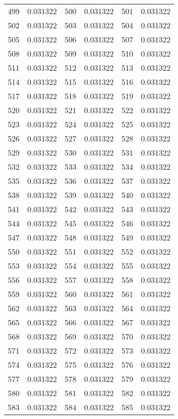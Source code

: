 \documentclass[12pt]{article}
\begin{document}
\begin{longtable}{@{}cc|cc|cc@{}}
499 & 0.031322 & 500 & 0.031322 & 501 & 0.031322 \\
502 & 0.031322 & 503 & 0.031322 & 504 & 0.031322 \\
505 & 0.031322 & 506 & 0.031322 & 507 & 0.031322 \\
508 & 0.031322 & 509 & 0.031322 & 510 & 0.031322 \\
511 & 0.031322 & 512 & 0.031322 & 513 & 0.031322 \\
514 & 0.031322 & 515 & 0.031322 & 516 & 0.031322 \\
517 & 0.031322 & 518 & 0.031322 & 519 & 0.031322 \\
520 & 0.031322 & 521 & 0.031322 & 522 & 0.031322 \\
523 & 0.031322 & 524 & 0.031322 & 525 & 0.031322 \\
526 & 0.031322 & 527 & 0.031322 & 528 & 0.031322 \\
529 & 0.031322 & 530 & 0.031322 & 531 & 0.031322 \\
532 & 0.031322 & 533 & 0.031322 & 534 & 0.031322 \\
535 & 0.031322 & 536 & 0.031322 & 537 & 0.031322 \\
538 & 0.031322 & 539 & 0.031322 & 540 & 0.031322 \\
541 & 0.031322 & 542 & 0.031322 & 543 & 0.031322 \\
544 & 0.031322 & 545 & 0.031322 & 546 & 0.031322 \\
547 & 0.031322 & 548 & 0.031322 & 549 & 0.031322 \\
550 & 0.031322 & 551 & 0.031322 & 552 & 0.031322 \\
553 & 0.031322 & 554 & 0.031322 & 555 & 0.031322 \\
556 & 0.031322 & 557 & 0.031322 & 558 & 0.031322 \\
559 & 0.031322 & 560 & 0.031322 & 561 & 0.031322 \\
562 & 0.031322 & 563 & 0.031322 & 564 & 0.031322 \\
565 & 0.031322 & 566 & 0.031322 & 567 & 0.031322 \\
568 & 0.031322 & 569 & 0.031322 & 570 & 0.031322 \\
571 & 0.031322 & 572 & 0.031322 & 573 & 0.031322 \\
574 & 0.031322 & 575 & 0.031322 & 576 & 0.031322 \\
577 & 0.031322 & 578 & 0.031322 & 579 & 0.031322 \\
580 & 0.031322 & 581 & 0.031322 & 582 & 0.031322 \\
583 & 0.031322 & 584 & 0.031322 & 585 & 0.031322 \\

\end{longtable}
\end{document}
